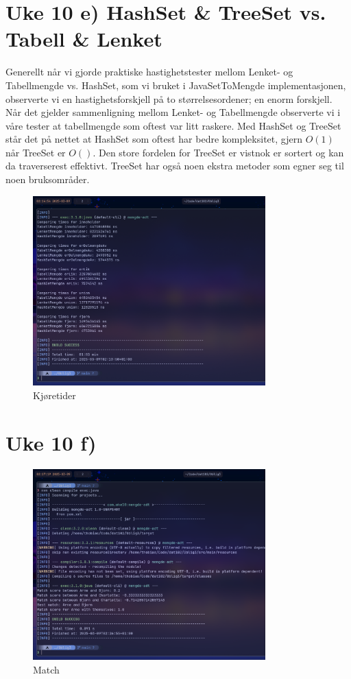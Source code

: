 \documentclass[12pt]{article}
\begin{document}
\section*{Uke 10 e) HashSet \& TreeSet vs. Tabell \& Lenket }
Generellt når vi gjorde praktiske hastighetstester mellom Lenket- og Tabellmengde 
vs. HashSet, som vi bruket i JavaSetToMengde implementasjonen, observerte vi 
en hastighetsforskjell på to størrelsesordener; en enorm forskjell. 
Når det gjelder sammenligning mellom Lenket- og Tabellmengde observerte vi i våre tester at 
tabellmengde som oftest var litt raskere. Med HashSet og TreeSet står det på nettet at 
HashSet som oftest har bedre kompleksitet, gjern \(O(1)\) når TreeSet er \(O()\).  
Den store fordelen for TreeSet er vistnok er sortert og kan da traverserest effektivt. 
TreeSet har også noen ekstra metoder som egner seg til noen bruksområder.

\begin{figure}[h]
    \centering
    \includegraphics[width=0.8\textwidth]{./EffektivitetsSammenligning.png} 
    \caption{Kjøretider}
    \label{fig:runtimes}
\end{figure}

\section*{Uke 10 f)} 
\begin{figure}[h]
    \centering
    \includegraphics[width=0.8\textwidth]{./Match.png} 
    \caption{Match}
    \label{fig:match}
\end{figure}
\end{document}
